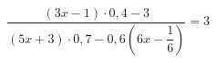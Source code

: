 \begin{ex}[type=equation]
	\begin{condition}
		$\dfrac{(3x - 1)\cdot0,4 - 3}{(5x + 3)\cdot0,7 - 0,6\left(6x -\dfrac{1}{6}\right)} = 3$
	\end{condition}
\end{ex}
